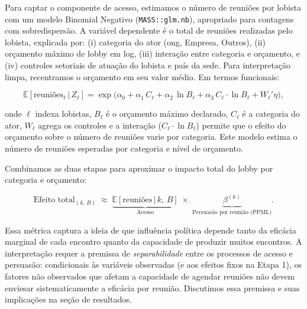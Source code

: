 Para captar o componente de acesso, estimamos o número de reuniões por lobista com um modelo Binomial Negativo (\texttt{MASS::glm.nb}), apropriado para contagens com sobredispersão. A variável dependente é o total de reuniões realizadas pelo lobista, explicada por: (i) categoria do ator (\acrshort{ong}, Empresa, Outros), (ii) orçamento máximo de lobby em log, (iii) interação entre categoria e orçamento, e (iv) controles setoriais de atuação do lobista e país da sede. Para interpretação limpa, recentramos o orçamento em seu valor médio. Em termos funcionais:

\begin{equation}
    \mathbb{E}[\text{reuniões}_\ell\,|\,Z_\ell] = \exp\big(\alpha_0 + \alpha_1\,C_\ell + \alpha_2\,\ln B_\ell + \alpha_3\,C_\ell\cdot\ln B_\ell + W_\ell'\eta\big),
\end{equation}

onde $\ell$ indexa lobistas, $B_\ell$ é o orçamento máximo declarado, $C_\ell$ é a categoria do ator, $W_\ell$ agrega os controles e a interação ($C_\ell \cdot \ln B_\ell$) permite que o efeito do orçamento sobre o número de reuniões varie por categoria. Este modelo estima o número de reuniões esperadas por categoria e nível de orçamento.

Combinamos as duas etapas para aproximar o impacto total do lobby por categoria e orçamento:

\begin{equation}
    \text{Efeito total}_{(k,\,B)} \;\approx\; \underbrace{\mathbb{E}[\text{reuniões}\,|\,k,\,B]}_{\text{Acesso}}\;\times\; \underbrace{\beta^{(k)}}_{\text{Persuasão por reunião (PPML)}}.
\end{equation}

Essa métrica captura a ideia de que influência política depende tanto da eficácia marginal de cada encontro quanto da capacidade de produzir muitos encontros. A interpretação requer a premissa de \textit{separabilidade} entre os processos de acesso e persuasão: condicionais às variáveis observadas (e aos efeitos fixos na Etapa 1), os fatores não observados que afetam a capacidade de agendar reuniões não devem enviesar sistematicamente a eficácia por reunião. Discutimos essa premissa e suas implicações na seção de resultados.


